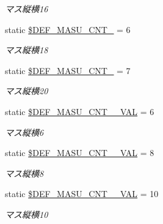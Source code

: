 \begin{DoxyCompactItemize}
\begin{DoxyCompactList}\small\item\em マス縦横16 \end{DoxyCompactList}\item 
\mbox{\label{class_reversi_const_ac4cdee79d87ba30c9e1ad5f76763a3c9}} 
static \hyperlink{class_reversi_const_ac4cdee79d87ba30c9e1ad5f76763a3c9}{\$\+D\+E\+F\+\_\+\+M\+A\+S\+U\+\_\+\+C\+N\+T\+\_} = 6
\begin{DoxyCompactList}\small\item\em マス縦横18 \end{DoxyCompactList}\item 
\mbox{\label{class_reversi_const_a45a5b589a2b3ac2af7d0e5d638791ffc}} 
static \hyperlink{class_reversi_const_a45a5b589a2b3ac2af7d0e5d638791ffc}{\$\+D\+E\+F\+\_\+\+M\+A\+S\+U\+\_\+\+C\+N\+T\+\_} = 7
\begin{DoxyCompactList}\small\item\em マス縦横20 \end{DoxyCompactList}\item 
\mbox{\label{class_reversi_const_a610ea7766cdf77e22ee36f195efc73a1}} 
static \hyperlink{class_reversi_const_a610ea7766cdf77e22ee36f195efc73a1}{\$\+D\+E\+F\+\_\+\+M\+A\+S\+U\+\_\+\+C\+N\+T\+\_\+\_\+\+V\+AL} = 6
\begin{DoxyCompactList}\small\item\em マス縦横6 \end{DoxyCompactList}\item 
\mbox{\label{class_reversi_const_a0ae1ba6bd2dfeac3259b9b6afaaed4d2}} 
static \hyperlink{class_reversi_const_a0ae1ba6bd2dfeac3259b9b6afaaed4d2}{\$\+D\+E\+F\+\_\+\+M\+A\+S\+U\+\_\+\+C\+N\+T\+\_\+\_\+\+V\+AL} = 8
\begin{DoxyCompactList}\small\item\em マス縦横8 \end{DoxyCompactList}\item 
\mbox{\label{class_reversi_const_a711060d4402e0e7f4e5ea5f9c3d0e407}} 
static \hyperlink{class_reversi_const_a711060d4402e0e7f4e5ea5f9c3d0e407}{\$\+D\+E\+F\+\_\+\+M\+A\+S\+U\+\_\+\+C\+N\+T\+\_\+\_\+\+V\+AL} = 10
\begin{DoxyCompactList}\small\item\em マス縦横10 \end{DoxyCompactList}\item 

\end{DoxyCompactItemize}
